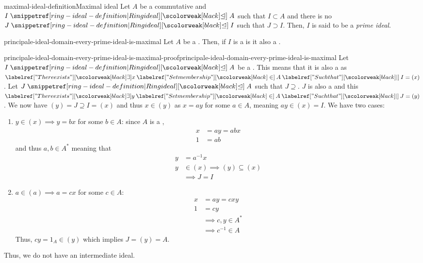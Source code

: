 \documentclass[preview]{standalone}
\begin{document}
\begin{snippetdefinition}{maximal-ideal-definition}{Maximal ideal}
    Let \(A\) be a commutative \ring and \(I \idealin A\) such that \(I \subset A\)
    and there is no \(J \idealin I\) such that \(J \supset I\).
    Then, \(I\) is said to be a \emph{prime ideal}.
\end{snippetdefinition}


\begin{snippetproposition}{principale-ideal-domain-every-prime-ideal-is-maximal}{}
    Let \(A\) be a \principalidealdomain. Then, if \(I\)
    is a \primeideal is it also a \maximalideal.
\end{snippetproposition}

\begin{snippetproof}{principale-ideal-domain-every-prime-ideal-is-maximal-proof}{principale-ideal-domain-every-prime-ideal-is-maximal}{}
    Let \(I \idealin A\) be a \primeideal. This means that it is also a \principalideal
    as \(\exists x \in A \suchthat I = (x)\). Let \(J \idealin A\)
    such that \(J \supseteq\).
    \(J\) is also a \principalideal and this \(\exists y \in A \suchthat J = (y)\).
    We now have \((y) = J \supseteq I = (x)\)
    and thus \(x \in (y)\) as \(x = ay\) for some \(a\in A\),
    meaning \(ay \in (x) = I\).
    We have two cases:
    \begin{enumerate}
        \item \(y\in(x) \implies y = bx\) for some \(b\in A\):
            since \(A\) is a \principalidealdomain,
            \begin{align*}
                x &= ay = abx \\
                1 &= ab
            \end{align*}
            and thus \(a,b \in A^*\) meaning that 
            \begin{align*}
                y &= a^{-1} x \\
                y &\in (x) \implies (y) \subseteq (x) \\
                &\implies J=I
            \end{align*}
        \item \(a \in (a) \implies a = cx\) for some \(c\in A\):
        \begin{align*}
            x &= ay = cxy \\
            1 &= cy \\
            &\implies c,y \in A^* \\
            &\implies c^{-1} \in A
        \end{align*}
        Thus, \(c y = 1_A \in (y)\) which implies \(J = (y) = A\).
    \end{enumerate}
    Thus, we do not have an intermediate ideal.
\end{snippetproof}
\end{document}
